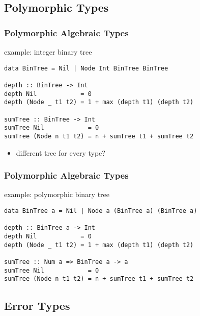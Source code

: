 \documentclass[dvipsnames]{beamer}
\theoremstyle{plain}
\begin{document}
\subsection{Polymorphic Types}

\begin{frame}[fragile]
  \frametitle{Polymorphic Algebraic Types}

  \begin{exampleblock}{example: integer binary tree}
    \begin{lstlisting}
data BinTree = Nil | Node Int BinTree BinTree

depth :: BinTree -> Int
depth Nil            = 0
depth (Node _ t1 t2) = 1 + max (depth t1) (depth t2)

sumTree :: BinTree -> Int
sumTree Nil            = 0
sumTree (Node n t1 t2) = n + sumTree t1 + sumTree t2
    \end{lstlisting}
  \end{exampleblock}

  \pause
  \begin{itemize}
    \item different tree for every type?
  \end{itemize}
\end{frame}

\begin{frame}[fragile]
  \frametitle{Polymorphic Algebraic Types}

  \begin{exampleblock}{example: polymorphic binary tree}
    \begin{lstlisting}
data BinTree a = Nil | Node a (BinTree a) (BinTree a)

depth :: BinTree a -> Int
depth Nil            = 0
depth (Node _ t1 t2) = 1 + max (depth t1) (depth t2)

sumTree :: Num a => BinTree a -> a
sumTree Nil            = 0
sumTree (Node n t1 t2) = n + sumTree t1 + sumTree t2
    \end{lstlisting}
  \end{exampleblock}
\end{frame}

\subsection{Error Types}
\end{document}
